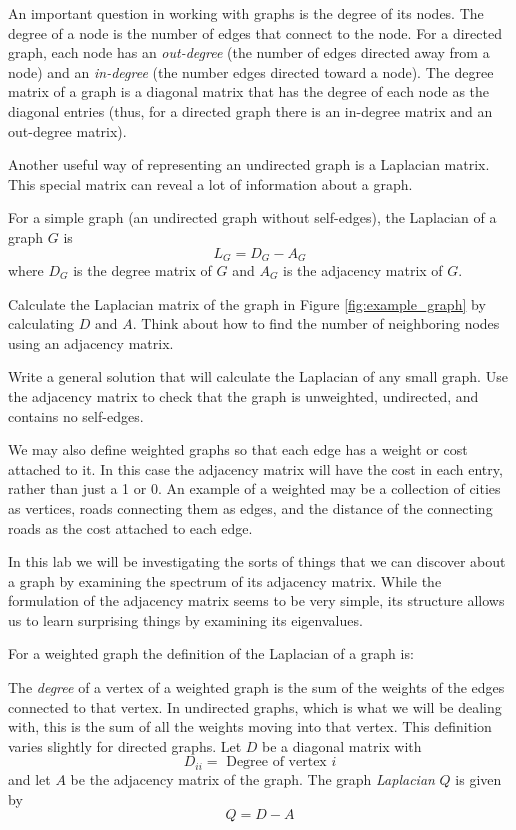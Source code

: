 An important question in working with graphs is the degree of its nodes.
The degree of a node is the number of edges that connect to the node.
For a directed graph, each node has an \emph{out-degree} (the number of edges directed away from a node) and an \emph{in-degree} (the number edges directed toward a node).
The degree matrix of a graph is a diagonal matrix that has the degree of each node as the diagonal entries (thus, for a directed graph there is an in-degree matrix and an out-degree matrix).

Another useful way of representing an undirected graph is a Laplacian matrix.
This special matrix can reveal a lot of information about a graph.
\begin{definition}
For a simple graph (an undirected graph without self-edges), the Laplacian of a graph $G$ is
\[ L_G = D_G - A_G \]
where $D_G$ is the degree matrix of $G$ and $A_G$ is the adjacency matrix of $G$.
\end{definition}


\begin{problem}
Calculate the Laplacian matrix of the graph in Figure \ref{fig:example_graph} by calculating $D$ and $A$.
Think about how to find the number of neighboring nodes using an adjacency matrix.

Write a general solution that will calculate the Laplacian of any small graph.
Use the adjacency matrix to check that the graph is unweighted, undirected, and contains no self-edges.
\label{prob:laplacian}
\end{problem}


We may also define weighted graphs so that each edge has a weight or cost attached to it.
In this case the adjacency matrix will have the cost in each entry, rather than just a 1 or 0.
An example of a weighted may be a collection of cities as vertices, roads connecting them as edges, and the distance of the connecting roads as the cost attached to each edge.

In this lab we will be investigating the sorts of things that we can discover about a graph by examining the spectrum of its adjacency matrix.
While the formulation of the adjacency matrix seems to be very simple, its structure allows us to learn surprising things by examining its eigenvalues.

For a weighted graph the definition of the Laplacian of a graph is:

\begin{definition}  The \emph{degree} of a vertex of a weighted graph is the sum of the weights of the edges connected to that vertex.
In undirected graphs, which is what we will be dealing with, this is the sum of all the weights moving into that vertex.
This definition varies slightly for directed graphs.
Let $D$ be a diagonal matrix with
\[
D_{ii} = \mbox{ Degree of vertex $i$}
\]
and let $A$ be the adjacency matrix of the graph.
The graph \emph{Laplacian} $Q$ is given by
\[
Q = D-A
\]
\end{definition}

